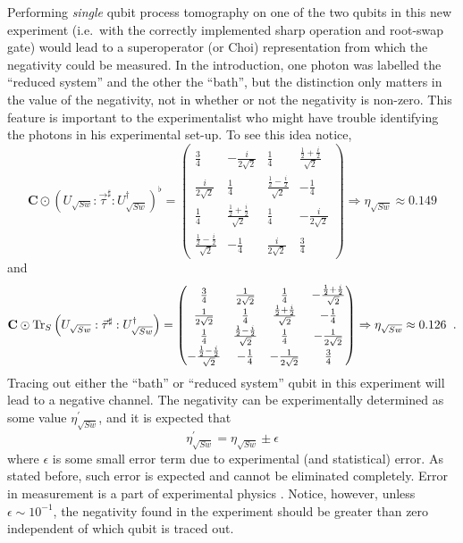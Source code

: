 Performing {\em single} qubit process tomography on one of the two qubits in this new experiment (i.e.\ with the correctly implemented sharp operation and root-swap gate) would lead to a superoperator (or Choi) representation from which the negativity could be measured.  In the introduction, one photon was labelled the ``reduced system'' and the other the ``bath'', but the distinction only matters in the value of the negativity, not in whether or not the negativity is non-zero.  This feature is important to the experimentalist who might have trouble identifying the photons in his experimental set-up.  To see this idea notice,
$$
\mathbf{C}\odot\left(U_{\sqrt{Sw}}:\vec{\tau}^\sharp:U_{\sqrt{Sw}}^\dagger\right)^\flat =
\begin{pmatrix}
 \frac{3}{4} & -\frac{i}{2 \sqrt{2}} & \frac{1}{4} & \frac{\frac{1}{2}+\frac{i}{2}}{\sqrt{2}} \\
 \frac{i}{2 \sqrt{2}} & \frac{1}{4} & \frac{\frac{1}{2}-\frac{i}{2}}{\sqrt{2}} & -\frac{1}{4} \\
 \frac{1}{4} & \frac{\frac{1}{2}+\frac{i}{2}}{\sqrt{2}} & \frac{1}{4} & -\frac{i}{2 \sqrt{2}} \\
 \frac{\frac{1}{2}-\frac{i}{2}}{\sqrt{2}} & -\frac{1}{4} & \frac{i}{2 \sqrt{2}} & \frac{3}{4}
\end{pmatrix}\Rightarrow \eta_{\sqrt{Sw}} \approx 0.149
$$
and
$$
\mathbf{C}\odot\operatorname{Tr}_S\left(U_{\sqrt{Sw}}:\vec{\tau}^\sharp:U_{\sqrt{Sw}}^\dagger\right) =
\begin{pmatrix}
 \frac{3}{4} & \frac{1}{2 \sqrt{2}} & \frac{1}{4} & -\frac{\frac{1}{2}+\frac{i}{2}}{\sqrt{2}} \\
 \frac{1}{2 \sqrt{2}} & \frac{1}{4} & \frac{\frac{1}{2}+\frac{i}{2}}{\sqrt{2}} & -\frac{1}{4} \\
 \frac{1}{4} & \frac{\frac{1}{2}-\frac{i}{2}}{\sqrt{2}} & \frac{1}{4} & -\frac{1}{2 \sqrt{2}} \\
 -\frac{\frac{1}{2}-\frac{i}{2}}{\sqrt{2}} & -\frac{1}{4} & -\frac{1}{2 \sqrt{2}} & \frac{3}{4}
\end{pmatrix}\Rightarrow \eta_{\sqrt{Sw}} \approx 0.126\;\;.
$$
Tracing out either the ``bath'' or ``reduced system'' qubit in this experiment will lead to a negative channel.  The negativity can be experimentally determined as some value $\eta_{\sqrt{Sw}}^\prime$, and it is expected that
$$
\eta_{\sqrt{Sw}}^\prime = \eta_{\sqrt{Sw}} \pm \epsilon
$$
where $\epsilon$ is some small error term due to experimental (and statistical) error.  As stated before, such error is expected and cannot be eliminated completely.  Error in measurement is a part of experimental physics \cite{Taylor1997}.  Notice, however, unless $\epsilon\sim 10^{-1}$, the negativity found in the experiment should be greater than zero independent of which qubit is traced out.  

